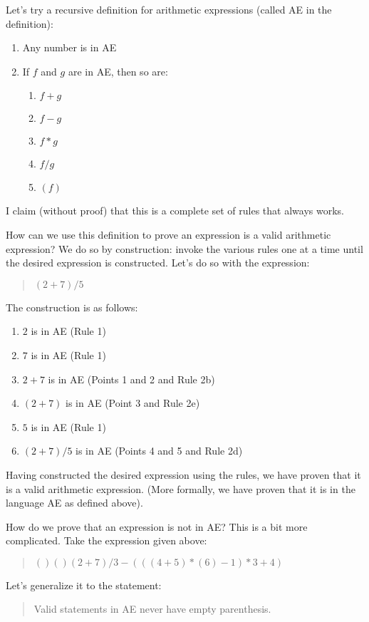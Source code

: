 \documentclass[letterpaper,12pt,openany,reqno]{book}%
\begin{document}
Let's try a recursive definition for arithmetic expressions (called AE in the definition):

\begin{enumerate}
\item Any number is in AE
\item If $f$ and $g$ are in AE, then so are:
\begin{enumerate}
\item $f + g$
\item $f - g$
\item $f * g$
\item $f / g$
\item $(f)$
\end{enumerate}
\end{enumerate}
I claim (without proof) that this is a complete set of rules that always works.

How can we use this definition to prove an expression is a valid arithmetic expression? We do so by construction: invoke the various rules one at a time until the desired expression is constructed. Let's do so with the expression:
\begin{quote}
$(2+7)/5$
\end{quote}
The construction is as follows:
\begin{enumerate}
\item $2$ is in AE (Rule 1)
\item $7$ is in AE (Rule 1)
\item $2+7$ is in AE (Points 1 and 2 and Rule 2b)
\item $(2+7)$ is in AE (Point 3 and Rule 2e)
\item $5$ is in AE (Rule 1)
\item $(2+7)/5$ is in AE (Points 4 and 5 and Rule 2d)
\end{enumerate}
Having constructed the desired expression using the rules, we have proven that it is a valid arithmetic expression. (More formally, we have proven that it is in the language AE as defined above).

How do we prove that an expression is not in AE? This is a bit more complicated. Take the expression given above:
\begin{quote}
$()()(2+7)/3-(((4+5)*(6)-1)*3 + 4)$
\end{quote}
Let's generalize it to the statement:
\begin{quote}
Valid statements in AE never have empty parenthesis.
\end{quote}
\end{document}
